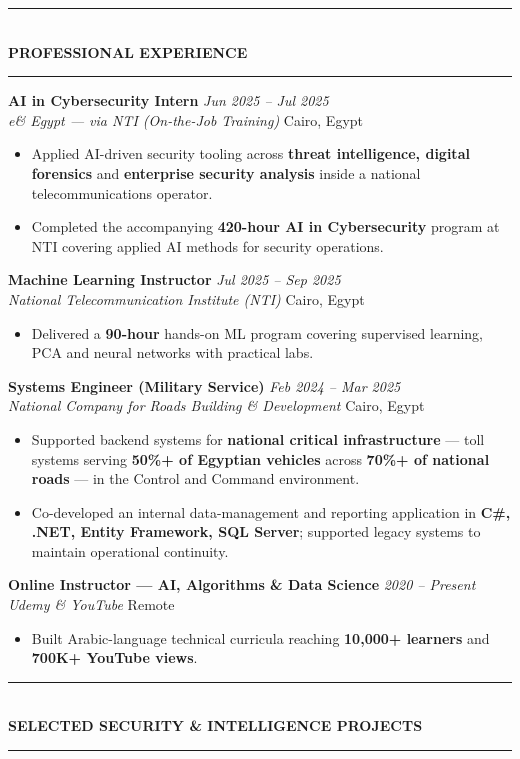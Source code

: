 \documentclass[10pt, a4paper]{article}
\newcommand{\cvsection}[1]{%
  \vspace{3pt}%
  {\color{navy}\rule{\linewidth}{1.1pt}}\\[0.5pt]%
  {\color{navy}\bfseries\fontsize{9.5}{11}\selectfont\uppercase{#1}}\\[-4pt]%
  {\color{teal}\rule{\linewidth}{0.6pt}}%
  \vspace{2pt}%
}
\newcommand{\cventry}[4]{%
  \vspace{2.5pt}%
  \textbf{\color{darkgray}#1} \hfill {\color{midgray}\textit{#3}}\\[-1.5pt]%
  {\color{teal}\textit{#2}} \hfill {\color{midgray}#4}%
}
\newenvironment{cvitems}{%
  \begin{itemize}[leftmargin=11pt, itemsep=0.5pt, parsep=0pt, topsep=1pt,
                  label={\textcolor{teal}{$\bullet$}}]
}{%
  \end{itemize}%
}
\begin{document}
\cvsection{Professional Experience}

\cventry{AI in Cybersecurity Intern}{e\& Egypt --- via NTI (On-the-Job Training)}
        {Jun 2025 -- Jul 2025}{Cairo, Egypt}
\begin{cvitems}
  \item Applied AI-driven security tooling across \textbf{threat intelligence, digital forensics} and \textbf{enterprise security analysis} inside a national telecommunications operator.
  \item Completed the accompanying \textbf{420-hour AI in Cybersecurity} program at NTI covering applied AI methods for security operations.
\end{cvitems}

\cventry{Machine Learning Instructor}{National Telecommunication Institute (NTI)}
        {Jul 2025 -- Sep 2025}{Cairo, Egypt}
\begin{cvitems}
  \item Delivered a \textbf{90-hour} hands-on ML program covering supervised learning, PCA and neural networks with practical labs.
\end{cvitems}

\cventry{Systems Engineer (Military Service)}{National Company for Roads Building \& Development}
        {Feb 2024 -- Mar 2025}{Cairo, Egypt}
\begin{cvitems}
  \item Supported backend systems for \textbf{national critical infrastructure} --- toll systems serving \textbf{50\%+ of Egyptian vehicles} across \textbf{70\%+ of national roads} --- in the Control and Command environment.
  \item Co-developed an internal data-management and reporting application in \textbf{C\#, .NET, Entity Framework, SQL Server}; supported legacy systems to maintain operational continuity.
\end{cvitems}

\cventry{Online Instructor --- AI, Algorithms \& Data Science}{Udemy \& YouTube}
        {2020 -- Present}{Remote}
\begin{cvitems}
  \item Built Arabic-language technical curricula reaching \textbf{10,000+ learners} and \textbf{700K+ YouTube views}.
\end{cvitems}

\cvsection{Selected Security \& Intelligence Projects}
\end{document}
